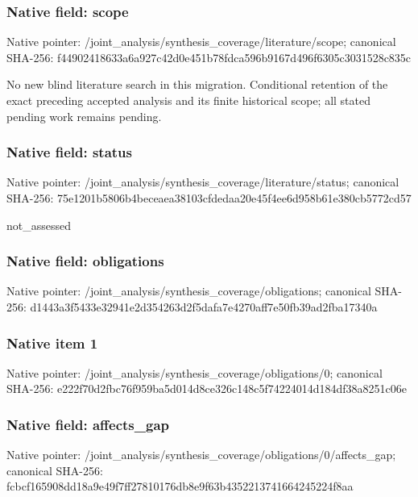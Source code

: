 \documentclass[10pt,a4paper]{article}
\begin{document}
\subsubsection{Native field: scope}
Native pointer: /joint\_\allowbreak{}analysis/synthesis\_\allowbreak{}coverage/literature/scope; canonical SHA-256: f44902418633a6a927c42d0e451b78fdca596b9167d496f6305c3031528c835c

\begingroup\raggedright\sloppy No new blind literature search in this migration. Conditional retention of the exact preceding accepted analysis and its finite historical scope;\allowbreak{} all stated pending work remains pending.\par\endgroup

\subsubsection{Native field: status}
Native pointer: /joint\_\allowbreak{}analysis/synthesis\_\allowbreak{}coverage/literature/status; canonical SHA-256: 75e1201b5806b4beceaea38103cfdedaa20e45f4ee6d958b61e380cb5772cd57

\begingroup\raggedright\sloppy not\_\allowbreak{}assessed\par\endgroup

\subsubsection{Native field: obligations}
Native pointer: /joint\_\allowbreak{}analysis/synthesis\_\allowbreak{}coverage/obligations; canonical SHA-256: d1443a3f5433e32941e2d354263d2f5dafa7e4270aff7e50fb39ad2fba17340a

\subsubsection{Native item 1}
Native pointer: /joint\_\allowbreak{}analysis/synthesis\_\allowbreak{}coverage/obligations/0; canonical SHA-256: e222f70d2fbc76f959ba5d014d8ce326c148c5f74224014d184df38a8251c06e

\subsubsection{Native field: affects\_\allowbreak{}gap}
Native pointer: /joint\_\allowbreak{}analysis/synthesis\_\allowbreak{}coverage/obligations/0/affects\_\allowbreak{}gap; canonical SHA-256: fcbcf165908dd18a9e49f7ff27810176db8e9f63b4352213741664245224f8aa
\end{document}
